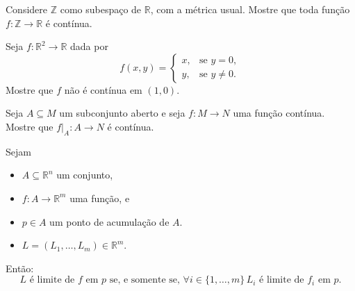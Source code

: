 \begin{exercise}
    Considere $\mathbb Z$ como subespaço de $\mathbb R$, com a métrica usual.
    Mostre que toda função $f:\mathbb Z\rightarrow \mathbb R$ é contínua.
\end{exercise}

\begin{exercise}
    Seja $f:\mathbb R^2\rightarrow\mathbb R$ dada por
    \[
        f(x,y)=
        \begin{cases}
            x, & \text{se } y=0,\\
            y, & \text{se } y\neq 0.
        \end{cases}
    \]
    Mostre que $f$ não é contínua em $(1,0)$.
\end{exercise}

\begin{exercise}
    Seja $A\subseteq M$ um subconjunto aberto e seja $f:M\rightarrow N$ uma função contínua.
    Mostre que $f|_A:A\rightarrow N$ é contínua.
\end{exercise}



\begin{proposition}Sejam
    \begin{itemize}
        \item $A\subseteq \mathbb R^n$ um conjunto,
        \item $f: A \to \mathbb R^m$ uma função, e
        \item $p \in A$ um ponto de acumulação de $A$.
        \item $L=(L_1, \dots, L_m)\in \mathbb R^m$.
    \end{itemize}

    Então:
    \[
        L \text{ é limite de } f \text{ em } p \text{ se, e somente se, } \forall i \in \{1, \dots, m\}\, L_i \text{ é limite de } f_i \text{ em } p.
    \]
\end{proposition}

